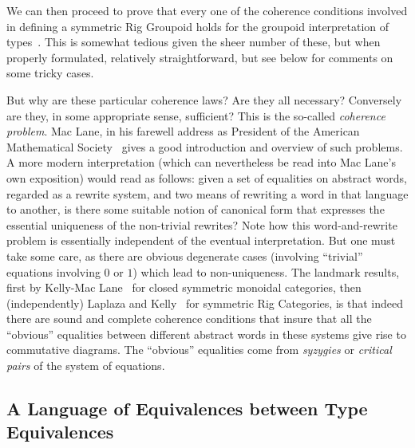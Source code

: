 \documentclass{article}
\begin{document}
We can then proceed to prove that every one of the coherence conditions
involved in defining a symmetric Rig Groupoid holds for the groupoid
interpretation of types~\cite{Carette2016}.  This is somewhat tedious
given the sheer number of these, but when properly formulated,
relatively straightforward, but see below for comments on some
tricky cases.

But why are these particular coherence laws? Are they all necessary?
Conversely are they, in some appropriate sense, sufficient? This is
the so-called \emph{coherence problem}. Mac Lane, in his farewell address
as President of the American Mathematical Society~\cite{MacLane1976} gives
a good introduction and overview of such problems.  A more modern
interpretation (which can nevertheless be read into Mac Lane's own
exposition) would read as follows: given a set of equalities on abstract
words, regarded as a rewrite system, and two means of rewriting a word
in that language to another, is there some suitable notion of canonical
form that expresses the essential uniqueness of the non-trivial 
rewrites?  Note how this word-and-rewrite problem is essentially
independent of the eventual interpretation. But one must take some care,
as there are obvious degenerate cases (involving ``trivial'' equations
involving $0$ or $1$) which lead to non-uniqueness. The landmark
results, first by Kelly-Mac Lane~\cite{KELLY197197} for closed
symmetric monoidal categories, then (independently) Laplaza and
Kelly~\cite{laplaza72,kelly74} for symmetric Rig Categories, is
that indeed there are sound and complete coherence conditions that
insure that all the ``obvious'' equalities between different abstract
words in these systems give rise to commutative diagrams. The
``obvious'' equalities come from \emph{syzygies} or
\emph{critical pairs} of the system of equations.

\subsection{A Language of Equivalences between Type Equivalences} 
\end{document}
